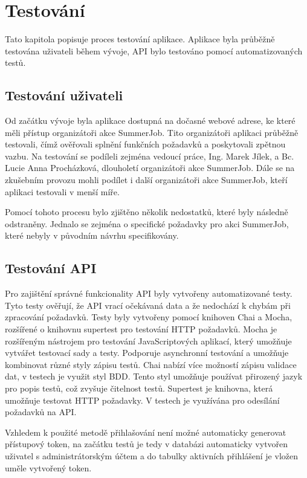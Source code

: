 \chapter{Testování}

Tato kapitola popisuje proces testování aplikace. Aplikace byla průběžně testována uživateli během vývoje, API bylo testováno pomocí automatizovaných testů.

\section{Testování uživateli}

Od začátku vývoje byla aplikace dostupná na dočasné webové adrese, ke které měli přístup organizátoři akce SummerJob. Tito organizátoři aplikaci průběžně testovali,
čímž ověřovali splnění funkčních požadavků a poskytovali zpětnou vazbu. Na testování se podíleli zejména vedoucí práce, Ing. Marek Jílek, a Bc. Lucie Anna Procházková,
dlouholetí organizátoři akce SummerJob. Dále se na zkušebním provozu mohli podílet i další organizátoři akce SummerJob, kteří aplikaci testovali v menší míře.

Pomocí tohoto procesu bylo zjištěno několik nedostatků, které byly následně odstraněny. Jednalo se zejména o specifické požadavky pro akci SummerJob, které nebyly
v původním návrhu specifikovány. 

\section{Testování API}

Pro zajištění správné funkcionality API byly vytvořeny automatizované testy. Tyto testy ověřují, že API vrací očekávaná data a že nedochází k chybám při zpracování požadavků.
Testy byly vytvořeny pomocí knihoven Chai a Mocha, rozšířené o knihovnu supertest pro testování HTTP požadavků.
Mocha je rozšířeným nástrojem pro testování JavaScriptových aplikací, který umožňuje vytvářet testovací sady a testy. Podporuje asynchronní testování a umožňuje
kombinovat různé styly zápisu testů. Chai nabízí více možností zápisu validace dat, v testech je využit styl BDD. Tento styl umožňuje používat přirozený jazyk
pro popis testů, což zvyšuje čitelnost testů. Supertest je knihovna, která umožňuje testovat HTTP požadavky. V testech je využívána pro odesílání požadavků na API.

Vzhledem k použité metodě přihlašování není možné automaticky generovat přístupový token, na začátku testů je tedy v databázi automaticky
vytvořen uživatel s administrátorským účtem a do tabulky aktivních přihlášení je vložen uměle vytvořený token. 

